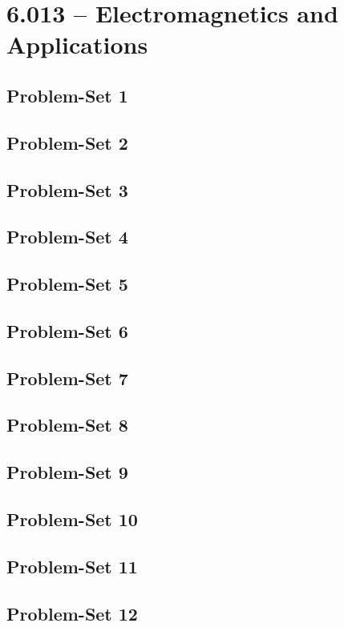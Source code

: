 \section{6.013 -- Electromagnetics and Applications}
\subsection{Problem-Set 1}
\subsection{Problem-Set 2}
\subsection{Problem-Set 3}
\subsection{Problem-Set 4}
\subsection{Problem-Set 5}
\subsection{Problem-Set 6}
\subsection{Problem-Set 7}
\subsection{Problem-Set 8}
\subsection{Problem-Set 9}
\subsection{Problem-Set 10}
\subsection{Problem-Set 11}
\subsection{Problem-Set 12}

